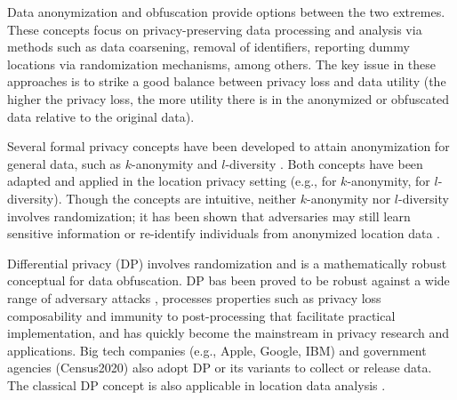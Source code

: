 \documentclass[10pt,journal,compsoc]{IEEEtran}
\begin{document}
Data anonymization and obfuscation  provide options between the two extremes. These concepts focus on privacy-preserving data processing and analysis via methods such as data coarsening, removal of identifiers,  reporting dummy locations via randomization mechanisms, among others.  The key issue in these approaches is to strike a good balance between privacy loss and data utility (the higher the privacy loss, the more utility there is in the anonymized or obfuscated data relative to the original data).  

Several formal privacy concepts have been developed to attain  anonymization for general data, such as $k$-anonymity  \cite{samarati2001protecting, sweeney2002k} and $l$-diversity \cite{machanavajjhala2007diversity}. Both concepts have been adapted and applied in the location privacy setting (e.g.,  \cite{gruteser2003anonymous,kido2005protection,gedik2007protecting, ghinita2007prive,lu2008pad,chow2009casper,gkoulalas2010providing,niu2014achieving,fei2017k,zhao2018illia,wang2019achieving, zhang2019caching} for $k$-anonymity, \cite{terrovitis2008privacy, liu2009query, tu2018protecting} for $l$-diversity). Though the concepts are intuitive, neither $k$-anonymity nor $l$-diversity  involves randomization; it has been shown that adversaries may still learn sensitive information or re-identify individuals from anonymized location data \cite{de2013unique,wang2018privacy}. 

Differential privacy (DP) \cite{dwork2006calibrating} involves randomization and is a mathematically robust conceptual for data obfuscation. DP bas been proved to be robust against a wide range of adversary attacks \cite{nissim2017differential, dwork2017exposed}, processes properties such as privacy loss composability \cite{mcsherry2007mechanism} and immunity to post-processing \cite{dwork2014algorithmic} that facilitate practical implementation, and has quickly become the mainstream in privacy research and applications. Big tech companies (e.g., Apple, Google, IBM) and government agencies (Census2020) also adopt DP or its variants to collect or release data. The classical DP concept is also applicable in location data analysis \cite{asada2019and, bavadekar2020google, aktay2020google, xiao2015protecting}.  
\end{document}
